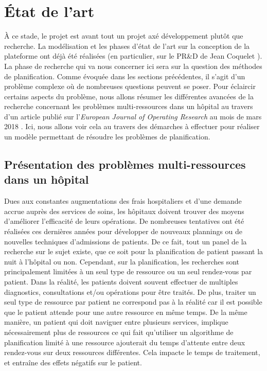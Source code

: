\documentclass[noposter]{polytech/polytech}
\begin{document}
\chapter{État de l'art}

À ce stade, le projet est avant tout un projet axé développement plutôt que recherche. La modélisation et les phases d'état de l'art sur la conception de la plateforme ont déjà été réalisées (en particulier, sur le PR\&D de Jean Coquelet \cite{coquelet_gestion_nodate}). La phase de recherche qui va nous concerner ici sera sur la question des méthodes de planification. Comme évoquée dans les sections précédentes, il s'agit d'un problème complexe où de nombreuses questions peuvent se poser. Pour éclaircir certains aspects du problème, nous allons résumer les différentes avancées de la recherche concernant les problèmes multi-ressources dans un hôpital au travers d'un article publié sur l'\textit{European Journal of Operating Research} au mois de mars 2018 \cite{marynissen_literature_2019}. Ici, nous allons voir cela au travers des démarches à effectuer pour réaliser un modèle permettant de résoudre les problèmes de planification.


\section{Présentation des problèmes multi-ressources dans un hôpital}

Dues aux constantes augmentations des frais hospitaliers et d'une demande accrue auprès des services de soins, les hôpitaux doivent trouver des moyens d'améliorer l'efficacité de leurs opérations. De nombreuses tentatives ont été réalisées ces dernières années pour développer de nouveaux plannings ou de nouvelles techniques d'admissions de patients. De ce fait, tout un panel de la recherche sur le sujet existe, que ce soit pour la planification de patient passant la nuit à l'hôpital ou non. Cependant, sur la planification, les recherches sont principalement limitées à un seul type de ressource ou un seul rendez-vous par patient. Dans la réalité, les patients doivent souvent effectuer de multiples diagnostics, consultations et/ou opérations pour être traités. De plus, traiter un seul type de ressource par patient ne correspond pas à la réalité car il est possible que le patient attende pour une autre ressource en même temps. De la même manière, un patient qui doit naviguer entre plusieurs services, implique nécessairement plus de ressources ce qui fait qu'utiliser un algorithme de planification limité à une ressource ajouterait du temps d'attente entre deux rendez-vous sur deux ressources différentes. Cela impacte le temps de traitement, et entraîne des effets négatifs sur le patient.
\end{document}
